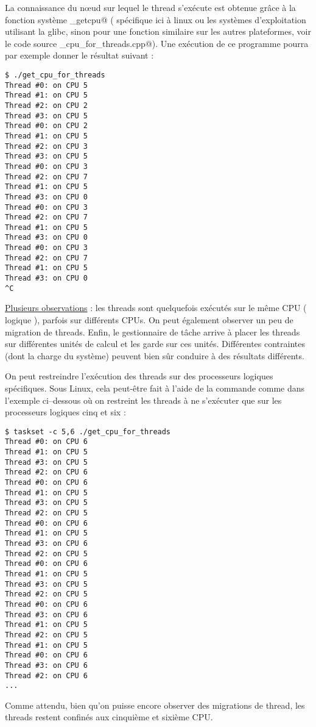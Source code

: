 \documentclass[fleqn,11pt]{article}
\begin{document}
La connaissance du n{\oe}ud sur lequel le thread s'exécute est obtenue grâce à la fonction système \lstinline@sched_getcpu@ ( spécifique ici à linux ou les systèmes d'exploitation utilisant la glibc, sinon pour une fonction similaire sur les autres plateformes, voir le code source \verb@get_cpu_for_threads.cpp@). Une exécution de ce programme pourra par exemple donner le résultat suivant :

\begin{verbatim}
$ ./get_cpu_for_threads
Thread #0: on CPU 5
Thread #1: on CPU 5
Thread #2: on CPU 2
Thread #3: on CPU 5
Thread #0: on CPU 2
Thread #1: on CPU 5
Thread #2: on CPU 3
Thread #3: on CPU 5
Thread #0: on CPU 3
Thread #2: on CPU 7
Thread #1: on CPU 5
Thread #3: on CPU 0
Thread #0: on CPU 3
Thread #2: on CPU 7
Thread #1: on CPU 5
Thread #3: on CPU 0
Thread #0: on CPU 3
Thread #2: on CPU 7
Thread #1: on CPU 5
Thread #3: on CPU 0
^C 
\end{verbatim}

\underline{Plusieurs observations} : les threads sont quelquefois exécutés sur le même CPU ( logique ), parfois
sur différents CPUs. On peut également observer un peu de migration de threads. Enfin, le gestionnaire de tâche
arrive à placer les threads sur différentes unités de calcul et les garde sur ces unités. Différentes contraintes (dont la charge du système) peuvent bien sûr conduire à des résultats différents.

On peut restreindre l'exécution des threads sur des processeurs logiques spécifiques. Sous Linux, cela peut-être
fait à l'aide de la commande  \lstinline@taskset@ comme dans l'exemple ci--dessous où on restreint les threads
à ne s'exécuter que sur les processeurs logiques cinq et six :


\begin{verbatim}
$ taskset -c 5,6 ./get_cpu_for_threads
Thread #0: on CPU 6
Thread #1: on CPU 5
Thread #3: on CPU 5
Thread #2: on CPU 6
Thread #0: on CPU 6
Thread #1: on CPU 5
Thread #3: on CPU 5
Thread #2: on CPU 5
Thread #0: on CPU 6
Thread #1: on CPU 5
Thread #3: on CPU 6
Thread #2: on CPU 5
Thread #0: on CPU 6
Thread #1: on CPU 5
Thread #3: on CPU 5
Thread #2: on CPU 5
Thread #0: on CPU 6
Thread #3: on CPU 6
Thread #1: on CPU 5
Thread #2: on CPU 5
Thread #1: on CPU 5
Thread #0: on CPU 6
Thread #3: on CPU 6
Thread #2: on CPU 6
...
\end{verbatim}

Comme attendu, bien qu'on puisse encore observer des migrations de thread, les threads restent confinés aux
cinquième et sixième CPU.
\end{document}

